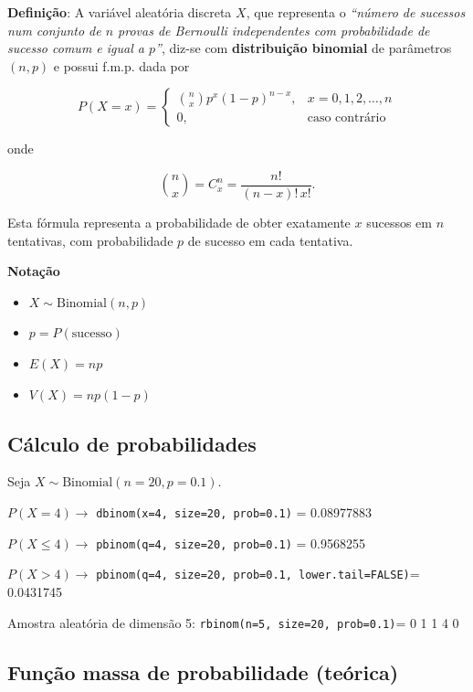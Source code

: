 \documentclass[
]{book}
\providecommand{\tightlist}{%
  \setlength{\itemsep}{0pt}\setlength{\parskip}{0pt}}
\begin{document}
\textbf{Definição}: A variável aleatória discreta \(X\), que representa o \emph{``número de sucessos num conjunto de \(n\) provas de Bernoulli independentes com probabilidade de sucesso comum e igual a \(p\)''}, diz-se com \textbf{distribuição binomial} de parâmetros \((n, p)\) e possui f.m.p. dada por

\[
P(X = x) = 
\begin{cases} 
\binom{n}{x} p^x (1 - p)^{n - x}, & x = 0, 1, 2, \ldots, n \\ 
0, & \text{caso contrário}
\end{cases}
\]

onde

\[
\binom{n}{x} = C_x^n = \frac{n!}{(n - x)! \, x!}.
\]

Esta fórmula representa a probabilidade de obter exatamente \(x\) sucessos em \(n\) tentativas, com probabilidade \(p\) de sucesso em cada tentativa.

\textbf{Notação}

\begin{itemize}
\tightlist
\item
  \(X \sim \text{Binomial}(n,p)\)
\item
  \(p = P(\text{sucesso})\)
\item
  \(E(X) = np\)
\item
  \(V(X) = np(1-p)\)
\end{itemize}

\subsection{Cálculo de probabilidades}\label{cuxe1lculo-de-probabilidades-1}

Seja \(X\sim\text{Binomial}(n=20, p=0.1)\).

\(P(X = 4) \to\) \texttt{dbinom(x=4,\ size=20,\ prob=0.1)} = 0.08977883

\noindent \(P(X\leq 4) \to\) \texttt{pbinom(q=4,\ size=20,\ prob=0.1)} = 0.9568255

\noindent \(P(X > 4)\to\)
\texttt{pbinom(q=4,\ size=20,\ prob=0.1,\ lower.tail=FALSE)}= 0.0431745

\noindent Amostra aleatória de dimensão 5: \texttt{rbinom(n=5,\ size=20,\ prob=0.1)}= 0 1 1 4 0

\subsection{Função massa de probabilidade (teórica)}\label{funuxe7uxe3o-massa-de-probabilidade-teuxf3rica}
\end{document}
